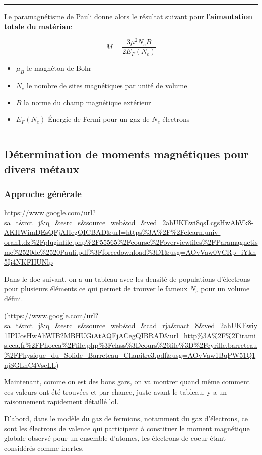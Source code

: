 \documentclass{article}
\begin{document}
\rule{\textwidth}{0.4pt}
\begin{center}
Le paramagnétisme de Pauli donne alors le résultat suivant pour l'\textbf{aimantation totale du matériau}:

$$M = \frac{3\mu^2 N_e B}{2 E_F(N_e)}$$

\begin{itemize}
    \item $\mu_B$ le magnéton de Bohr
    \item $N_e$ le nombre de sites magnétiques par unité de volume
    \item $B$ la norme du champ magnétique extérieur
    \item $E_F(N_e)$ Énergie de Fermi pour un gaz de $N_e$ électrons
\end{itemize}    
\end{center}

\rule{\textwidth}{0.4pt}
\subsection{Détermination de moments magnétiques pour divers métaux}
\subsubsection{Approche générale}
\url{https://www.google.com/url?sa=t&rct=j&q=&esrc=s&source=web&cd=&ved=2ahUKEwi8qsLcgsHwAhVk8-AKHWimDEsQFjAHegQICBAD&url=https%3A%2F%2Felearn.univ-oran1.dz%2Fpluginfile.php%2F55565%2Fcourse%2Foverviewfiles%2FParamagnetisme%2520de%2520Pauli.pdf%3Fforcedownload%3D1&usg=AOvVaw0VCRp_iYkn5Ij4NKFHUNlp}

Dans le doc suivant, on a un tableau avec les densité de populations d'électrons pour plusieurs éléments ce qui permet de trouver le fameux $N_e$ pour un volume défini.

(\url{https://www.google.com/url?sa=t&rct=j&q=&esrc=s&source=web&cd=&cad=rja&uact=8&ved=2ahUKEwiy1IPUosHwAhWIB2MBHUGiAtAQFjACegQIBRAD&url=http%3A%2F%2Firamis.cea.fr%2FPhocea%2Ffile.php%3Fclass%3Dcours%26file%3D%2Fcyrille.barreteau%2FPhysique_du_Solide_Barreteau_Chapitre3.pdf&usg=AOvVaw1BqPW51Q1njSGLnC4VscLL})

Maintenant, comme on est des bons gars, on va montrer quand même comment ces valeurs ont été trouvées et par chance, juste avant le tableau, y a un raisonnement rapidement détaillé lol.

D'abord, dans le modèle du gaz de fermions, notamment du gaz d'électrons, ce sont les électrons de valence qui participent à constituer le moment magnétique globale observé pour un ensemble d'atomes, les électrons de coeur étant considérés comme inertes.
\end{document}
